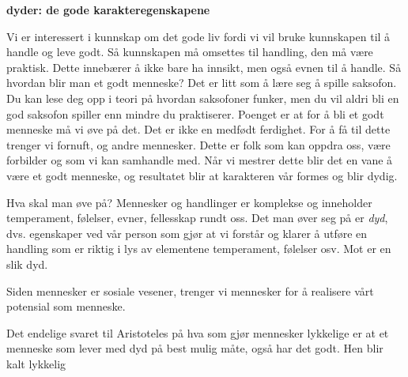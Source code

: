 \documentclass[11pt, a4paper]{article}
\newenvironment{sectionbox}[1][]{%
    \begin{sectionboxinner}
    \textbf{\large #1}
    \vspace{1pt}
    \newline
}{%
    \end{sectionboxinner}
}
\begin{document}
\begin{sectionbox}[dyder: de gode karakteregenskapene]
\begin{flushleft}
    Vi er interessert i kunnskap om det gode liv fordi vi vil bruke kunnskapen til å handle og leve godt. Så kunnskapen må omsettes til handling, den må være praktisk. Dette innebærer å ikke bare ha innsikt, men også evnen til å handle. Så hvordan blir man et godt menneske? Det er litt som å lære seg å spille saksofon. Du kan lese deg opp i teori på hvordan saksofoner funker, men du vil aldri bli en god saksofon spiller enn mindre du praktiserer. Poenget er at for å bli et godt menneske må vi øve på det. Det er ikke en medfødt ferdighet. For å få til dette trenger vi fornuft, og andre mennesker. Dette er folk som kan oppdra oss, være forbilder og som vi kan samhandle med. Når vi mestrer dette blir det en vane å være et godt menneske, og resultatet blir at karakteren vår formes og blir dydig.\\
\end{flushleft}
\begin{flushleft}
    Hva skal man øve på? Mennesker og handlinger er komplekse og inneholder temperament, følelser, evner, fellesskap rundt oss. Det man øver seg på er \textit{dyd}, dvs. egenskaper ved vår person som gjør at vi forstår og klarer å utføre en handling som er riktig i lys av elementene temperament, følelser osv. Mot er en slik dyd. \\
\end{flushleft}
\begin{flushleft}
    \par Siden mennesker er sosiale vesener, trenger vi mennesker for å realisere vårt potensial som menneske.\\
\end{flushleft}
\begin{flushleft}
    \par Det endelige svaret til Aristoteles på hva som gjør mennesker lykkelige er at et menneske som lever med dyd på best mulig måte, også har det godt. Hen blir kalt lykkelig
\end{flushleft}
\end{sectionbox}
\end{document}
